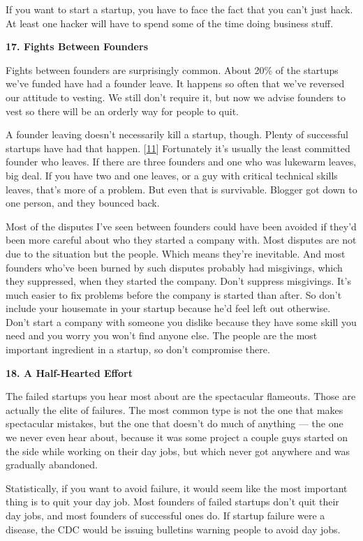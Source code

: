 If you want to start a startup, you have to face the fact that you can't
just hack. At least one hacker will have to spend some of the time doing
business stuff.

\textbf{17. Fights Between Founders}

Fights between founders are surprisingly common. About 20\% of the
startups we've funded have had a founder leave. It happens so often that
we've reversed our attitude to vesting. We still don't require it, but
now we advise founders to vest so there will be an orderly way for
people to quit.

A founder leaving doesn't necessarily kill a startup, though. Plenty of
successful startups have had that happen. {[}\hyperref[f11n]{11}{]}
Fortunately it's usually the least committed founder who leaves. If
there are three founders and one who was lukewarm leaves, big deal. If
you have two and one leaves, or a guy with critical technical skills
leaves, that's more of a problem. But even that is survivable. Blogger
got down to one person, and they bounced back.

Most of the disputes I've seen between founders could have been avoided
if they'd been more careful about who they started a company with. Most
disputes are not due to the situation but the people. Which means
they're inevitable. And most founders who've been burned by such
disputes probably had misgivings, which they suppressed, when they
started the company. Don't suppress misgivings. It's much easier to fix
problems before the company is started than after. So don't include your
housemate in your startup because he'd feel left out otherwise. Don't
start a company with someone you dislike because they have some skill
you need and you worry you won't find anyone else. The people are the
most important ingredient in a startup, so don't compromise there.

\textbf{18. A Half-Hearted Effort}

The failed startups you hear most about are the spectacular flameouts.
Those are actually the elite of failures. The most common type is not
the one that makes spectacular mistakes, but the one that doesn't do
much of anything --- the one we never even hear about, because it was
some project a couple guys started on the side while working on their
day jobs, but which never got anywhere and was gradually abandoned.

Statistically, if you want to avoid failure, it would seem like the most
important thing is to quit your day job. Most founders of failed
startups don't quit their day jobs, and most founders of successful ones
do. If startup failure were a disease, the CDC would be issuing
bulletins warning people to avoid day jobs.

